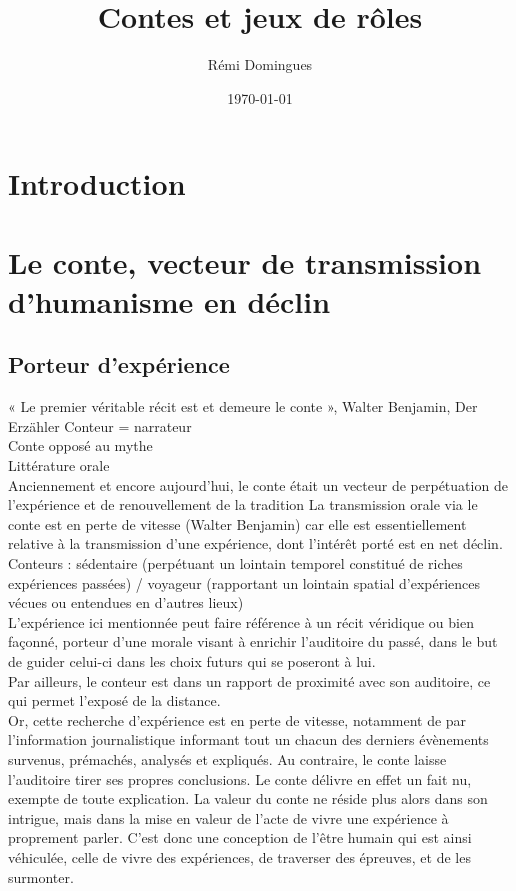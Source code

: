 \documentclass[a4paper,12pt,final,oneside]{article}
\title{Contes et jeux de rôles}
\author{Rémi Domingues}
\date{\today}
\begin{document}
\maketitle
\clearpage


\thispagestyle{empty}
\tableofcontents
\clearpage


\section{Introduction}
\setcounter{page}{1}
\clearpage


\section{Le conte, vecteur de transmission d'humanisme en déclin}
\subsection{Porteur d'expérience}
\cite{nouss2003conteur}
« Le premier véritable récit est et demeure le conte », Walter Benjamin, Der Erzähler\cite{benjamin1991gesammelte}
Conteur = narrateur\\
Conte opposé au mythe\\
Littérature orale\\
Anciennement et encore aujourd'hui, le conte était un vecteur de perpétuation de l'expérience et de renouvellement de la tradition
La transmission orale via le conte est en perte de vitesse (Walter Benjamin) car elle est essentiellement relative à la transmission d'une expérience, dont l'intérêt porté est en net déclin.\\
Conteurs : sédentaire (perpétuant un lointain temporel constitué de riches expériences passées) / voyageur (rapportant un lointain spatial d'expériences vécues ou entendues en d'autres lieux)\\

L'expérience ici mentionnée peut faire référence à un récit véridique ou bien façonné, porteur d'une morale visant à enrichir l'auditoire du passé, dans le but de guider celui-ci dans les choix futurs qui se poseront à lui.\\
Par ailleurs, le conteur est dans un rapport de proximité avec son auditoire, ce qui permet l'exposé de la distance.\\
Or, cette recherche d'expérience est en perte de vitesse, notamment de par l'information journalistique informant tout un chacun des derniers évènements survenus, prémachés, analysés et expliqués. Au contraire, le conte laisse l'auditoire tirer ses propres conclusions. Le conte délivre en effet un fait nu, exempte de toute explication. La valeur du conte ne réside plus alors dans son intrigue, mais dans la mise en valeur de l'acte de vivre une expérience à proprement parler. C'est donc une conception de l'être humain qui est ainsi véhiculée, celle de vivre des expériences, de traverser des épreuves, et de les surmonter.\\
\end{document}
